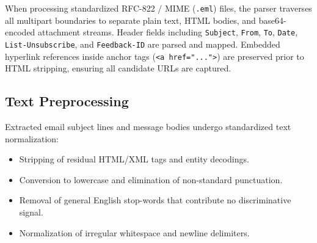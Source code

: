 \documentclass[conference]{IEEEtran}
\begin{document}
When processing standardized RFC-822 / MIME (\texttt{.eml}) files, the parser traverses all multipart boundaries to separate plain text, HTML bodies, and base64-encoded attachment streams. Header fields including \texttt{Subject}, \texttt{From}, \texttt{To}, \texttt{Date}, \texttt{List-Unsubscribe}, and \texttt{Feedback-ID} are parsed and mapped. Embedded hyperlink references inside anchor tags (\texttt{<a href="...">}) are preserved prior to HTML stripping, ensuring all candidate URLs are captured.

\subsection{Text Preprocessing}
Extracted email subject lines and message bodies undergo standardized text normalization:
\begin{itemize}
    \item Stripping of residual HTML/XML tags and entity decodings.
    \item Conversion to lowercase and elimination of non-standard punctuation.
    \item Removal of general English stop-words that contribute no discriminative signal.
    \item Normalization of irregular whitespace and newline delimiters.
\end{itemize}
\end{document}
